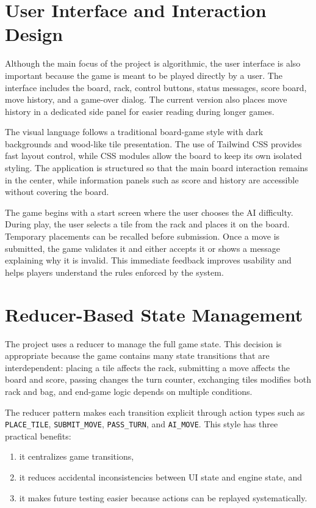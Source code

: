 \documentclass[conference]{IEEEtran}
\begin{document}
\section{User Interface and Interaction Design}
Although the main focus of the project is algorithmic, the user interface is also important because the game is meant to be played directly by a user. The interface includes the board, rack, control buttons, status messages, score board, move history, and a game-over dialog. The current version also places move history in a dedicated side panel for easier reading during longer games.

The visual language follows a traditional board-game style with dark backgrounds and wood-like tile presentation. The use of Tailwind CSS provides fast layout control, while CSS modules allow the board to keep its own isolated styling. The application is structured so that the main board interaction remains in the center, while information panels such as score and history are accessible without covering the board.

The game begins with a start screen where the user chooses the AI difficulty. During play, the user selects a tile from the rack and places it on the board. Temporary placements can be recalled before submission. Once a move is submitted, the game validates it and either accepts it or shows a message explaining why it is invalid. This immediate feedback improves usability and helps players understand the rules enforced by the system.

\section{Reducer-Based State Management}
The project uses a reducer to manage the full game state. This decision is appropriate because the game contains many state transitions that are interdependent: placing a tile affects the rack, submitting a move affects the board and score, passing changes the turn counter, exchanging tiles modifies both rack and bag, and end-game logic depends on multiple conditions.

The reducer pattern makes each transition explicit through action types such as \texttt{PLACE\_TILE}, \texttt{SUBMIT\_MOVE}, \texttt{PASS\_TURN}, and \texttt{AI\_MOVE}. This style has three practical benefits:
\begin{enumerate}
\item it centralizes game transitions,
\item it reduces accidental inconsistencies between UI state and engine state, and
\item it makes future testing easier because actions can be replayed systematically.
\end{enumerate}
\end{document}
